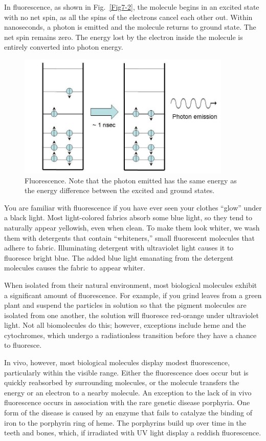 In fluorescence, as shown in Fig.~\ref{Fig7-2}, the molecule begins in an excited state with no net spin, as all the spins of the electrons cancel each other out.  Within nanoseconds, a photon is emitted and the molecule returns to ground state.  The net spin remains zero.  The energy lost by the electron inside the molecule is entirely converted into photon energy.
\begin{figure}[h]
	\centering
	\includegraphics[width=4.0in]{./figures/Topic7/Fig7-3.jpg}
	\caption{Fluorescence. Note that the photon emitted has the same energy as the energy difference between the excited and ground states.}
	\label{Fig7-3}
\end{figure}
You are familiar with fluorescence if you have ever seen your clothes ``glow'' under a black light.  Most light-colored fabrics absorb some blue light, so they tend to naturally appear yellowish, even when clean.  To make them look whiter, we wash them with detergents that contain ``whiteners,'' small fluorescent molecules that adhere to fabric.  Illuminating detergent with ultraviolet light causes it to fluoresce bright blue.  The added blue light emanating from the detergent molecules causes the fabric to appear whiter.

When isolated from their natural environment, most biological molecules exhibit a significant amount of fluorescence.  For example, if you grind leaves from a green plant and suspend the particles in solution so that the pigment molecules are isolated from one another, the solution will fluoresce red-orange under ultraviolet light.  Not all biomolecules do this; however, exceptions include heme and the cytochromes, which undergo a radiationless transition before they have a chance to fluoresce.

In vivo, however, most biological molecules display modest fluorescence, particularly within the visible range.  Either the fluorescence does occur but is quickly reabsorbed by surrounding molecules, or the molecule transfers the energy or an electron to a nearby molecule.  An exception to the lack of in vivo fluorescence occurs in association with the rare genetic disease porphyria.  One form of the disease is caused by an enzyme that fails to catalyze the binding of iron to the porphyrin ring of heme.  The porphyrins build up over time in the teeth and bones, which, if irradiated with UV light display a reddish fluorescence.

